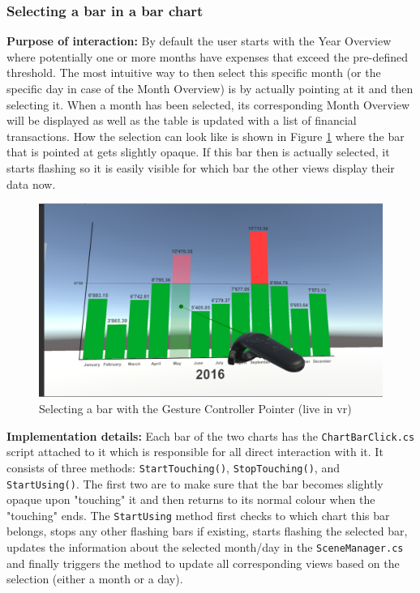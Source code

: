 \subsubsection{Selecting a bar in a bar chart}

\label{SubSubSectionSelectionBar}

\textbf{Purpose of interaction:} By default the user starts with the Year Overview where potentially one or more months have expenses that exceed the pre-defined threshold. The most intuitive way to then select this specific month (or the specific day in case of the Month Overview) is by actually pointing at it and then selecting it. When a month has been selected, its corresponding Month Overview will be displayed as well as the table is updated with a list of financial transactions. How the selection can look like is shown in Figure \ref{fig:unitybarselection} where the bar that is pointed at gets slightly opaque. If this bar then is actually selected, it starts flashing so it is easily visible for which bar the other views display their data now.
\begin{figure}[t]
	\begin{center}
		\includegraphics[width=12cm]{03_Figures/08_Development/Bar_Selection.png}
		\caption{Selecting a bar with the Gesture Controller Pointer (live in \gls{vr})}
		\label{fig:unitybarselection}
	\end{center}
\end{figure}

\textbf{Implementation details:} Each bar of the two charts has the \texttt{ChartBarClick.cs} script attached to it which is responsible for all direct interaction with it. It consists of three methods: \texttt{StartTouching()}, \texttt{StopTouching()}, and \texttt{StartUsing()}. The first two are to make sure that the bar becomes slightly opaque upon "touching" it and then returns to its normal colour when the "touching" ends. The \texttt{StartUsing} method first checks to which chart this bar belongs, stops any other flashing bars if existing, starts flashing the selected bar, updates the information about the selected month/day in the \texttt{SceneManager.cs} and finally triggers the method to update all corresponding views based on the selection (either a month or a day).

